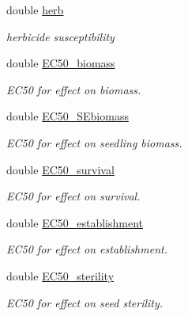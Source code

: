 \begin{DoxyCompactItemize}
double \mbox{\hyperlink{class_s_pft_traits_a50a419d8d60294c78f7122e0e7c02639}{herb}}
\begin{DoxyCompactList}\small\item\em herbicide susceptibility \end{DoxyCompactList}\item 
\mbox{\label{class_s_pft_traits_a3e60bc8f7c177aaf12ba01ee7d55471f}} 
double \mbox{\hyperlink{class_s_pft_traits_a3e60bc8f7c177aaf12ba01ee7d55471f}{E\+C50\+\_\+biomass}}
\begin{DoxyCompactList}\small\item\em E\+C50 for effect on biomass. \end{DoxyCompactList}\item 
\mbox{\label{class_s_pft_traits_a8367414be5599b78625b3e0f944631cf}} 
double \mbox{\hyperlink{class_s_pft_traits_a8367414be5599b78625b3e0f944631cf}{E\+C50\+\_\+\+S\+Ebiomass}}
\begin{DoxyCompactList}\small\item\em E\+C50 for effect on seedling biomass. \end{DoxyCompactList}\item 
\mbox{\label{class_s_pft_traits_a7816894696a9c03360f15ccf8750072f}} 
double \mbox{\hyperlink{class_s_pft_traits_a7816894696a9c03360f15ccf8750072f}{E\+C50\+\_\+survival}}
\begin{DoxyCompactList}\small\item\em E\+C50 for effect on survival. \end{DoxyCompactList}\item 
\mbox{\label{class_s_pft_traits_ac4294400a204e7fb372369c7ed6b7bd5}} 
double \mbox{\hyperlink{class_s_pft_traits_ac4294400a204e7fb372369c7ed6b7bd5}{E\+C50\+\_\+establishment}}
\begin{DoxyCompactList}\small\item\em E\+C50 for effect on establishment. \end{DoxyCompactList}\item 
\mbox{\label{class_s_pft_traits_a242eb61bbeccfadbd395d532e31c4289}} 
double \mbox{\hyperlink{class_s_pft_traits_a242eb61bbeccfadbd395d532e31c4289}{E\+C50\+\_\+sterility}}
\begin{DoxyCompactList}\small\item\em E\+C50 for effect on seed sterility. \end{DoxyCompactList}\item 

\end{DoxyCompactItemize}
